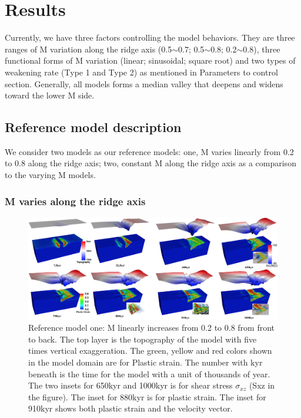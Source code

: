\pagebreak
\section{Results}
Currently, we have three factors controlling the model behaviors. They are three ranges of M variation along the ridge axis (0.5$\sim$0.7; 0.5$\sim$0.8; 0.2$\sim$0.8), three functional forms of M variation (linear; sinusoidal; square root) and two types of weakening rate (Type 1 and Type 2) as mentioned in Parameters to control section. Generally, all models forms a median valley that deepens and widens toward the lower M side. 

\subsection{Reference model description}
We consider two models as our reference models: one, M varies linearly from 0.2 to 0.8 along the ridge axis; two, constant M along the ridge axis as a comparison to the varying M models.

\subsubsection{M varies along the ridge axis}

\begin{figure}[H]
  \centering
    \includegraphics[width=1.0\textwidth]{fig_Results1_1.png}
  \caption{Reference model one: M linearly increases from 0.2 to 0.8 from front to back. The top layer is the topography of the model with five times vertical exaggeration. The green, yellow and red colors shown in the model domain are for Plastic strain. The number with kyr beneath is the time for the model with a unit of thousands of year. The two insets for 650kyr and 1000kyr is for shear stress $\sigma_{xz}$ (Sxz in the figure). The inset for 880kyr is for plastic strain. The inset for 910kyr shows both plastic strain and the velocity vector.} %
 \label{fig_Results1_1}
\end{figure}   

